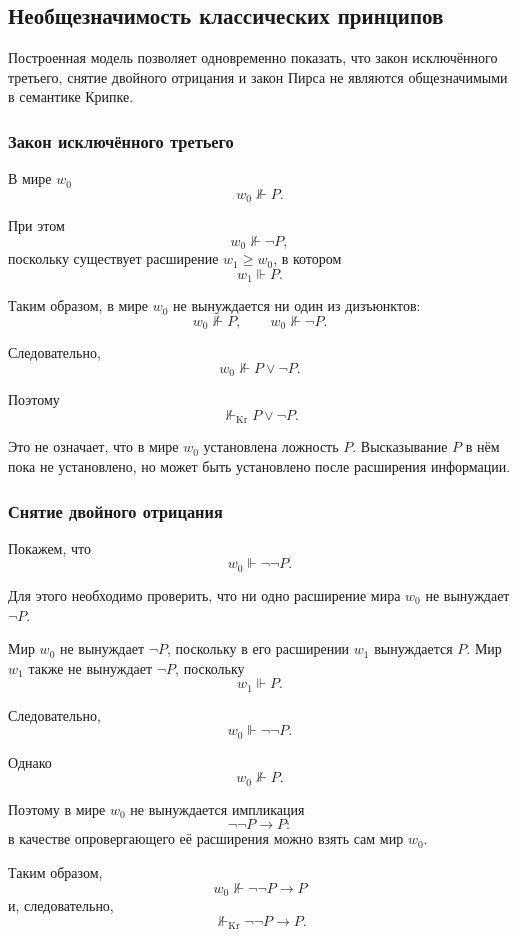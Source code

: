 \documentclass[12pt,a4paper,oneside,openany]{book}
\theoremstyle{definition}
\theoremstyle{plain}
\theoremstyle{remark}
\begin{document}
\subsection{Необщезначимость классических принципов}

Построенная модель позволяет одновременно показать, что закон
исключённого третьего, снятие двойного отрицания и закон Пирса не
являются общезначимыми в семантике Крипке.

\subsubsection{Закон исключённого третьего}

В мире \(w_0\)
\[
w_0\nVdash P.
\]

При этом
\[
w_0\nVdash\neg P,
\]
поскольку существует расширение \(w_1\geqslant w_0\), в котором
\[
w_1\Vdash P.
\]

Таким образом, в мире \(w_0\) не вынуждается ни один из дизъюнктов:
\[
w_0\nVdash P,
\qquad
w_0\nVdash\neg P.
\]

Следовательно,
\[
w_0\nVdash P\lor\neg P.
\]

Поэтому
\[
\nVdash_{\mathrm{Kr}}P\lor\neg P.
\]

Это не означает, что в мире \(w_0\) установлена ложность \(P\).
Высказывание \(P\) в нём пока не установлено, но может быть
установлено после расширения информации.

\subsubsection{Снятие двойного отрицания}

Покажем, что
\[
w_0\Vdash\neg\neg P.
\]

Для этого необходимо проверить, что ни одно расширение мира \(w_0\)
не вынуждает \(\neg P\).

Мир \(w_0\) не вынуждает \(\neg P\), поскольку в его расширении
\(w_1\) вынуждается \(P\). Мир \(w_1\) также не вынуждает \(\neg P\),
поскольку
\[
w_1\Vdash P.
\]

Следовательно,
\[
w_0\Vdash\neg\neg P.
\]

Однако
\[
w_0\nVdash P.
\]

Поэтому в мире \(w_0\) не вынуждается импликация
\[
\neg\neg P\to P:
\]
в качестве опровергающего её расширения можно взять сам мир \(w_0\).

Таким образом,
\[
w_0\nVdash\neg\neg P\to P
\]
и, следовательно,
\[
\nVdash_{\mathrm{Kr}}\neg\neg P\to P.
\]
\end{document}
